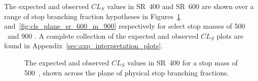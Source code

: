 The expected and observed $CL_S$ values in SR~400 and SR~600 are shown
over a range of stop branching fraction hypotheses in
Figures~\ref{fig:cls_plane_sr_400_m_500} and~\ref{fig:cls_plane_sr_600_m_900}
respectively for select stop masses of 500 \GeV\ and 900 \GeV.
A complete collection of the expected and observed $CL_S$ plots are found in
Appendix~\ref{sec:axp_interpretation_plots}.

\begin{figure}[p]
  \centering
  \caption{
    The expected and observed $CL_S$ values in SR~400 for a stop mass of
    500~\GeV, shown across the plane of physical stop branching fractions.
  }
  \label{fig:cls_plane_sr_400_m_500}
\end{figure}

